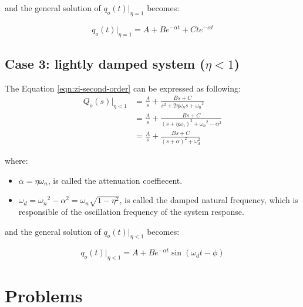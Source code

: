 \documentclass[a4paper,11pt]{book}
\begin{document}
and the general solution of $q_o(t)|_{\eta=1}$ becomes:

\begin{equation}
q_o(t)|_{\eta=1} = A + Be^{-\alpha t}+Cte^{-\alpha t}
\end{equation}

\subsection*{Case 3: lightly damped system ($\eta < 1$)}

The Equation \ref{eqn:zi-second-order} can be expressed as following:
\begin{align*}
Q_o(s)|_{\eta<1} &= \frac{A}{s} + \frac{Bs + C}{s^2 + 2 \eta \omega_n s + {\omega_n}^2} \\
&= \frac{A}{s} + \frac{Bs+C}{(s+\eta \omega_n)^2 + {\omega_n}^2 - \alpha^2} \\
&= \frac{A}{s} + \frac{Bs+C}{(s+\alpha)^2 + \omega_d^2}
\end{align*}

where: 
\begin{itemize}
\item $\alpha=\eta \omega_n$, is called the attenuation coeffiecent.
\item $\omega_d= {\omega_n}^2 - \alpha^2 = \omega_n \sqrt{1-\eta^2}$, is called the damped natural frequency, which is responsible of the oscillation frequency of the system response.
\end{itemize}

and the general solution of $q_o(t)|_{\eta<1}$ becomes:

\begin{equation}
q_o(t)|_{\eta<1} = A + Be^{- \alpha t}\sin(\omega_d t - \phi)
\end{equation}

\section*{Problems}
\end{document}
